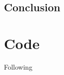 \documentclass[11pt,a4paper]{article}
\begin{document}
  \begin{multicols*}{2}

\section{\label{sect:conclusion}Conclusion}

\end{multicols*}




\appendix*
\section{Code}
Following



\end{document}
